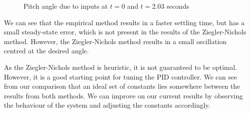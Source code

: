 \documentclass[12pt]{article}
\begin{document}
\begin{figure}
    \centering
    \caption{Pitch angle due to inputs at $t = 0$ and $t = 2.03$ seconds}
    \label{fig:tuning-comparison}
\end{figure}

We can see that the empirical method results in a faster settling time, but has a small steady-state error, which is not present in the results of the Ziegler-Nichols method. However, the Ziegler-Nichols method results in a small oscillation centred at the desired angle. 

As the Ziegler-Nichols method is heuristic, it is not guaranteed to be optimal. However, it is a good starting point for tuning the PID controller. We can see from our comparison that an ideal set of constants lies somewhere between the results from both methods. We can improve on our current results by observing the behaviour of the system and adjusting the constants accordingly.
\end{document}
